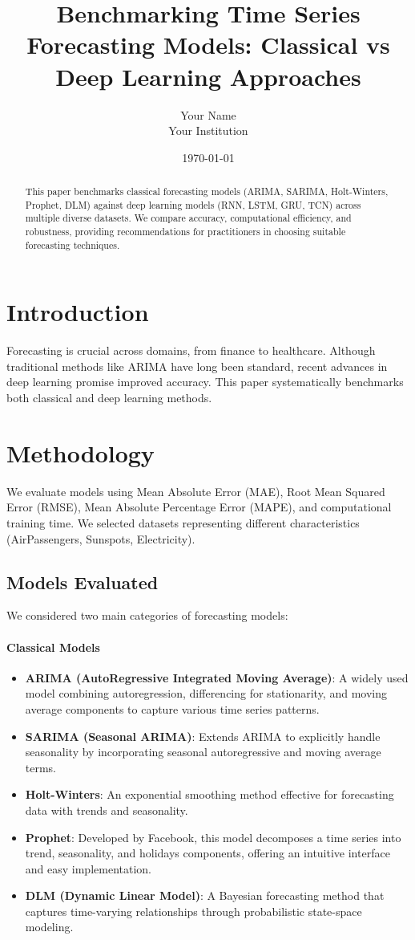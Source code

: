 \documentclass{article}
\title{Benchmarking Time Series Forecasting Models: Classical vs Deep Learning Approaches}
\author{Your Name\\Your Institution}
\date{\today}
\begin{document}
\maketitle

\begin{abstract}
This paper benchmarks classical forecasting models (ARIMA, SARIMA, Holt-Winters, Prophet, DLM) against deep learning models (RNN, LSTM, GRU, TCN) across multiple diverse datasets. We compare accuracy, computational efficiency, and robustness, providing recommendations for practitioners in choosing suitable forecasting techniques.
\end{abstract}

\section{Introduction}
Forecasting is crucial across domains, from finance to healthcare. Although traditional methods like ARIMA have long been standard, recent advances in deep learning promise improved accuracy. This paper systematically benchmarks both classical and deep learning methods.

\section{Methodology}
We evaluate models using Mean Absolute Error (MAE), Root Mean Squared Error (RMSE), Mean Absolute Percentage Error (MAPE), and computational training time. We selected datasets representing different characteristics (AirPassengers, Sunspots, Electricity).

\subsection{Models Evaluated}
We considered two main categories of forecasting models:

\paragraph{Classical Models}
\begin{itemize}
    \item \textbf{ARIMA (AutoRegressive Integrated Moving Average)}: A widely used model combining autoregression, differencing for stationarity, and moving average components to capture various time series patterns.
    \item \textbf{SARIMA (Seasonal ARIMA)}: Extends ARIMA to explicitly handle seasonality by incorporating seasonal autoregressive and moving average terms.
    \item \textbf{Holt-Winters}: An exponential smoothing method effective for forecasting data with trends and seasonality.
    \item \textbf{Prophet}: Developed by Facebook, this model decomposes a time series into trend, seasonality, and holidays components, offering an intuitive interface and easy implementation.
    \item \textbf{DLM (Dynamic Linear Model)}: A Bayesian forecasting method that captures time-varying relationships through probabilistic state-space modeling.
\end{itemize}
\end{document}

